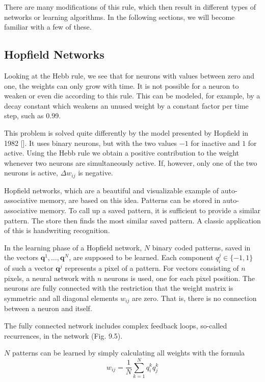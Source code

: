 \documentclass[10pt]{book}
\begin{document}
There are many modifications of this rule, which then result in different types of networks or learning algorithms. In the following sections, we will become familiar with a few of these.

\subsection{Hopfield Networks}
Looking at the Hebb rule, we see that for neurons with values between zero and one, the weights can only grow with time. It is not possible for a neuron to weaken or even die according to this rule. This can be modeled, for example, by a decay constant which weakens an unused weight by a constant factor per time step, such as 0.99.

This problem is solved quite differently by the model presented by Hopfield in 1982 [\cite{hopfield1982emergent}]. It uses binary neurons, but with the two values $-1$ for inactive and $1$ for active. Using the Hebb rule we obtain a positive contribution to the weight whenever two neurons are simultaneously active. If, however, only one of the two neurons is active, $\Delta w_{ij}$ is negative.

Hopfield networks, which are a beautiful and visualizable example of auto-associative memory, are based on this idea. Patterns can be stored in auto-associative memory. To call up a saved pattern, it is sufficient to provide a similar pattern. The store then finds the most similar saved pattern. A classic application of this is handwriting recognition.

In the learning phase of a Hopfield network, $N$ binary coded patterns, saved in the vectors $\boldsymbol{q}^{1}, \ldots, \boldsymbol{q}^{N}$, are supposed to be learned. Each component $q_{i}^{j} \in\{-1,1\}$ of such a vector $\boldsymbol{q}^{j}$ represents a pixel of a pattern. For vectors consisting of $n$ pixels, a neural network with $n$ neurons is used, one for each pixel position. The neurons are fully connected with the restriction that the weight matrix is symmetric and all diagonal elements $w_{ij}$ are zero. That is, there is no connection between a neuron and itself.

The fully connected network includes complex feedback loops, so-called recurrences, in the network (Fig. 9.5).

$N$ patterns can be learned by simply calculating all weights with the formula
\begin{equation*}
w_{ij}=\frac{1}{N} \sum_{k=1}^{N} q_{i}^{k} q_{j}^{k} \tag{9.1}
\end{equation*}
\end{document}
